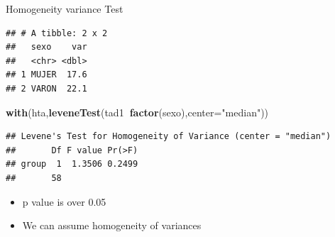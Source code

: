 \documentclass[
  ignorenonframetext,
]{beamer}
\newenvironment{Shaded}{\begin{snugshade}}{\end{snugshade}}
\newcommand{\DataTypeTok}[1]{\textcolor[rgb]{0.13,0.29,0.53}{#1}}
\newcommand{\KeywordTok}[1]{\textcolor[rgb]{0.13,0.29,0.53}{\textbf{#1}}}
\newcommand{\NormalTok}[1]{#1}
\newcommand{\OperatorTok}[1]{\textcolor[rgb]{0.81,0.36,0.00}{\textbf{#1}}}
\newcommand{\StringTok}[1]{\textcolor[rgb]{0.31,0.60,0.02}{#1}}
\providecommand{\tightlist}{%
  \setlength{\itemsep}{0pt}\setlength{\parskip}{0pt}}
\begin{document}
\begin{frame}[fragile]{Homogeneity variance Test}
\protect\hypertarget{homogeneity-variance-test}{}

\small

\begin{Shaded}
\end{Shaded}

\begin{verbatim}
## # A tibble: 2 x 2
##   sexo    var
##   <chr> <dbl>
## 1 MUJER  17.6
## 2 VARON  22.1
\end{verbatim}

\begin{Shaded}
\begin{Highlighting}[]
\KeywordTok{with}\NormalTok{(hta,}\KeywordTok{leveneTest}\NormalTok{(tad1}\OperatorTok{~}\KeywordTok{factor}\NormalTok{(sexo),}\DataTypeTok{center=}\StringTok{"median"}\NormalTok{))}
\end{Highlighting}
\end{Shaded}

\begin{verbatim}
## Levene's Test for Homogeneity of Variance (center = "median")
##       Df F value Pr(>F)
## group  1  1.3506 0.2499
##       58
\end{verbatim}

\begin{itemize}
\tightlist
\item
  p value is over 0.05
\item
  We can assume homogeneity of variances
\end{itemize}

\end{frame}
\end{document}
